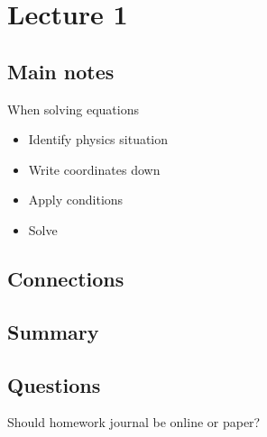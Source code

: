 \section{Lecture 1}

\subsection{Main notes}

When solving equations
\begin{itemize}
	\item Identify physics situation
  \item Write coordinates down
  \item Apply conditions
  \item Solve
\end{itemize}


\subsection{Connections}


\subsection{Summary}


\subsection{Questions}

Should homework journal be online or paper?
